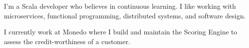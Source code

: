 

\begin{cvparagraph}

I'm a Scala developer who believes in continuous learning. I like working with microservices, functional programming, distributed systems, and software design.

I currently work at Monedo where I build and maintain the Scoring Engine to assess the credit-worthiness of a customer. 
\end{cvparagraph}
